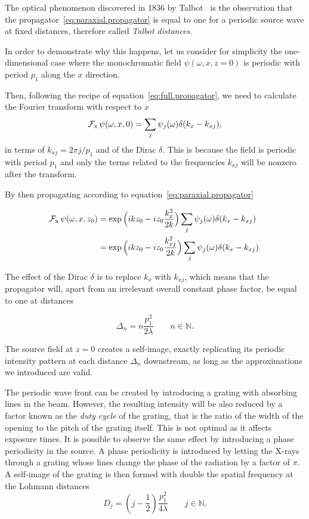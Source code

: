 The optical phenomenon discovered in 1836 by Talbot~\parencite{Talbot1836} is the observation that
the propagator~\eqref{eq:paraxial.propagator} is equal to one for a periodic
source wave at fixed distances, therefore called \emph{Talbot distances}.

In order to demonstrate why this happens, let us consider for simplicity the one-dimensional case where the
monochromatic field $\psi(\omega, x, z=0)$ is periodic with period $p_1$
along the $x$ direction. 

Then, following the recipe of equation~\eqref{eq:full.propagator}, we need
to calculate the Fourier transform with respect to $x$
\begin{equation*}
    \operatorname{\mathcal{F}_{x}}\psi(\omega, x, 0) = \sum_j \psi_j(\omega)\delta(k_x -
    k_{xj}),
\end{equation*}
in terms of $k_{xj} = 2\pi j/ p_1$ and of the Dirac $\delta$. This is
because the field is periodic with period $p_1$ and only the terms related
to the frequencies $k_{xj}$ will be nonzero after the transform.

By then propagating according to equation~\eqref{eq:paraxial.propagator}

\begin{align}
    \operatorname{\mathcal{F}_{x}}\psi(\omega, x, z_0) &= \exp\Big(ikz_0-i
    z_0\frac{k_x^2}{2k}\Big)\sum_j \psi_j(\omega)\delta(k_x -
    k_{xj}) \\
    &= \exp\Big(ikz_0-i z_0\frac{k_{xj}^2}{2k}\Big)\sum_j \psi_j(\omega)\delta(k_x -
    k_{xj}).
    \label{eq:talbot1}
\end{align}

The effect of the Dirac $\delta$ is to replace $k_x$ with $k_{xj}$, which
means that the propagator will, apart from an irrelevant overall constant phase
factor, be equal to one at distances

\begin{equation}
    \Delta_n = n \frac{p_1^2}{2 \lambda} \qquad n \in
    \mathbb{N}.\label{eq:talbot.distance}
\end{equation}

The source field at $z = 0$ creates a
self-image, exactly replicating its periodic intensity pattern at each
distance $\Delta_n$ downstream, as long as the approximations we introduced
are valid.

The periodic wave front can be created by introducing a grating with absorbing lines in
the beam. However, the resulting intensity will be also reduced by a factor
known as the \emph{duty cycle} of the grating, that is the ratio of the
width of the opening to the pitch of the grating itself. This is not optimal
as it affects exposure times. It is possible to observe the same effect
by introducing a phase periodicity in the source. A phase periodicity is
introduced by letting the X-rays
through a grating whose lines change the phase of the radiation by a
factor of $\pi$. A self-image of the grating is then formed with double the
spatial frequency at the Lohmann distances~\parencite{Lohmann1971}
\begin{equation}
    D_j = \left(j - \frac{1}{2}\right) \frac{p_1^2}{4 \lambda} \qquad
    j\in\mathbb{N}.\label{eq:lohmann-distance}
\end{equation}

